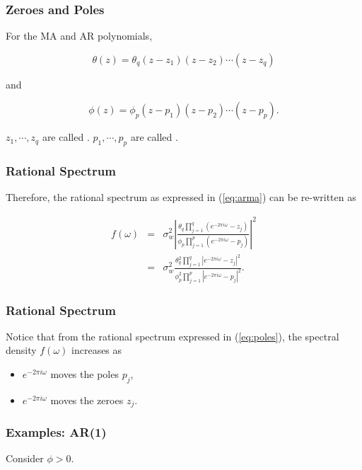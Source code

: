 \documentclass[%
xcolor=pdftex]{beamer}
\begin{document}
\begin{frame}
\frametitle{Zeroes and Poles}

For the MA and AR polynomials,

$$
\theta(z) = \theta_q(z-z_1)(z-z_2)\cdots(z-z_q)
$$

and

$$
\phi(z) = \phi_p(z-p_1)(z-p_2)\cdots(z-p_p).
$$

$z_1,\cdots, z_q$ are called \underline{\hspace{13 mm}}. $p_1,\cdots,p_p$ are called \underline{\hspace{13 mm}}.

\end{frame}

\begin{frame}
\frametitle{Rational Spectrum}

Therefore, the rational spectrum as expressed in (\ref{eq:arma}) can be re-written as

\begin{eqnarray} \label{eq:poles}
f(\omega) &=& \sigma_w^2  \left\lvert \frac{\theta_q \prod_{j=1}^q \left( e^{-2 \pi i \omega} - z_j \right)}{\phi_p \prod_{j=1}^p \left( e^{-2 \pi i \omega} - p_j \right)} \right\rvert  ^2 \nonumber \\
          &=& \sigma_w^2 \frac{\theta_q^2 \prod_{j=1}^q \left\lvert e^{-2 \pi i \omega} - z_j \right\rvert ^2}{\phi_p^2 \prod_{j=1}^p \left\lvert e^{-2 \pi i \omega} - p_j \right\rvert ^2}.
\end{eqnarray}

\end{frame}

\begin{frame}
\frametitle{Rational Spectrum}

Notice that from the rational spectrum expressed in (\ref{eq:poles}), the spectral density $f(\omega)$ increases as

\begin{itemize}
\item $e^{-2 \pi i \omega}$ moves \underline{\hspace{20 mm}} the poles $p_j$,
\item $e^{-2 \pi i \omega}$ moves \underline{\hspace{20 mm}} the zeroes $z_j$.
\end{itemize}

\end{frame}

\begin{frame}
\frametitle{Examples: AR(1)}

Consider $\phi>0$.

\vspace{50mm}

\end{frame}
\end{document}
